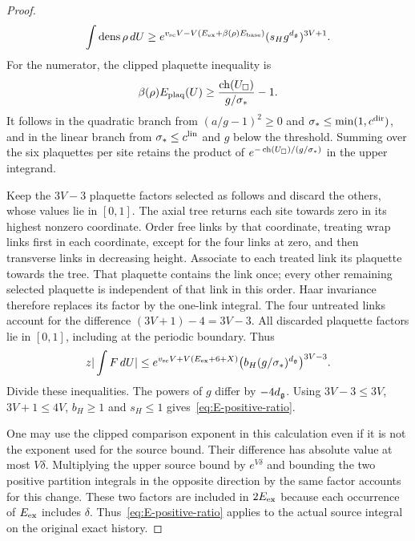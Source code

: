 \begin{proof}
\begin{equation*}
 \int\operatorname{dens}\rho\,dU\ge
 e^{v_{{\rm sc}}V-V(E_{\rm ex}+\beta(\rho)E_{\rm base})}
 (s_Hg^{d_{\mathfrak{g}}})^{3V+1}.
\end{equation*}
For the numerator, the clipped plaquette inequality is
\begin{equation*}
 \beta(\rho)E_{\rm plaq}(U)\ge
 \frac{\operatorname{ch}(U_\square)}{g/\sigma_*}-1.
\end{equation*}
It follows in the quadratic branch from $(a/g-1)^2\ge0$ and $\sigma_*\le\min(1,c^{\rm dir})$, and in the linear branch from $\sigma_*\le c^{\rm lin}$ and $g$ below the threshold. Summing over the six plaquettes per site retains the product of $e^{-\operatorname{ch}(U_\square)/(g/\sigma_*)}$ in the upper integrand.

Keep the $3V-3$ plaquette factors selected as follows and discard the others, whose values lie in $[0,1]$. The axial tree returns each site towards zero in its highest nonzero coordinate. Order free links by that coordinate, treating wrap links first in each coordinate, except for the four links at zero, and then transverse links in decreasing height. Associate to each treated link its plaquette towards the tree. That plaquette contains the link once; every other remaining selected plaquette is independent of that link in this order. Haar invariance therefore replaces its factor by the one-link integral. The four untreated links account for the difference $(3V+1)-4=3V-3$. All discarded plaquette factors lie in $[0,1]$, including at the periodic boundary. Thus
\begin{equation*}
 z|\int F\,dU|\le
 e^{v_{{\rm sc}}V+V(E_{\rm ex}+6+X)}
 \bigl(b_H(g/\sigma_*)^{d_{\mathfrak{g}}}\bigr)^{3V-3}.
\end{equation*}
Divide these inequalities. The powers of $g$ differ by $-4d_{\mathfrak{g}}$. Using $3V-3\le3V$, $3V+1\le4V$, $b_H\ge1$ and $s_H\le1$ gives~\eqref{eq:E-positive-ratio}.

One may use the clipped comparison exponent in this calculation even if it is not the exponent used for the source bound. Their difference has absolute value at most $V\delta$. Multiplying the upper source bound by $e^{V\delta}$ and bounding the two positive partition integrals in the opposite direction by the same factor accounts for this change. These two factors are included in $2E_{\rm ex}$ because each occurrence of $E_{\rm ex}$ includes $\delta$. Thus~\eqref{eq:E-positive-ratio} applies to the actual source integral on the original exact history.


\end{proof}
